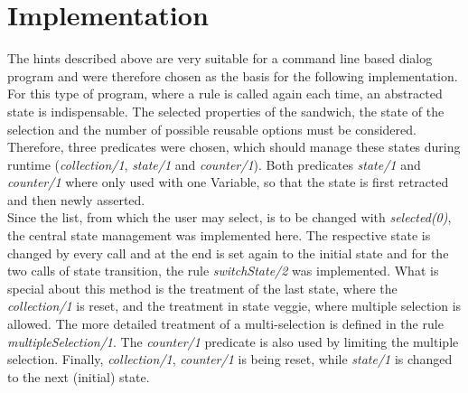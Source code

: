 \documentclass{article}
\begin{document}
	\section{Implementation}
	The hints described above are very suitable for a command line based dialog program and were therefore chosen as the basis for the following implementation. For this type of program, where a rule is called again each time, an abstracted state is indispensable. The selected properties of the sandwich, the state of the selection and the number of possible reusable options must be considered. Therefore, three predicates were chosen, which should manage these states during runtime (\textit{collection/1}, \textit{state/1} and  \textit{counter/1}). Both predicates \textit{state/1} and \textit{counter/1} where only used with one Variable, so that the state is first retracted and then newly asserted.\\
	Since the list, from which the user may select, is to be changed with \textit{selected(0)}, the central state management was implemented here. The respective state is changed by every call and at the end is set again to the initial state and for the two calls of state transition, the rule \textit{switchState/2} was implemented. What is special about this method is the treatment of the last state, where the \textit{collection/1} is reset, and the treatment in state veggie, where multiple selection is allowed. The more detailed treatment of a multi-selection is defined in the rule \textit{multipleSelection/1}. The \textit{counter/1} predicate is also used by limiting the multiple selection. Finally, \textit{collection/1}, \textit{counter/1} is being reset, while \textit{state/1} is changed to the next (initial) state.\\
\end{document}
